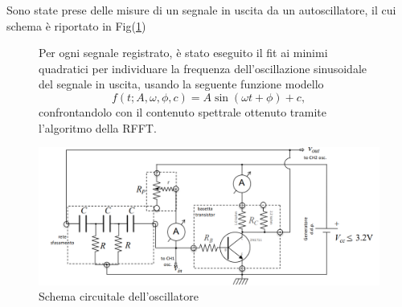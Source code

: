 \documentclass{article}
\begin{document}
Sono state prese delle misure di un segnale in uscita da un autoscillatore, il cui schema è riportato in Fig(\ref{fig:circuitino_oscillante})
\begin{figure}[H]
\begin{minipage}{0.445\textwidth}
Per ogni segnale registrato, è stato eseguito il fit ai minimi quadratici per individuare la frequenza dell'oscillazione sinusoidale del segnale in uscita, usando la seguente funzione modello
$$
    f(t; A, \omega, \phi, c) = A \sin{(\omega t + \phi)} + c,
$$
confrontandolo con il contenuto spettrale ottenuto tramite l'algoritmo della RFFT.
\end{minipage}
\hfill
\begin{minipage}{0.45\textwidth}
    \centering
    \includegraphics[width=\textwidth]{FFT11/schema_circuitino.png}
    \caption{Schema circuitale dell'oscillatore}
    \label{fig:circuitino_oscillante}
\end{minipage}
\end{figure}
\end{document}
